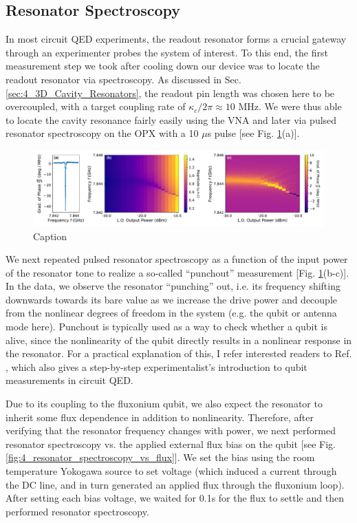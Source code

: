 \subsection{Resonator Spectroscopy}
In most circuit QED experiments, the readout resonator forms a crucial gateway through an experimenter probes the system of interest. To this end, the first measurement step we took after cooling down our device was to locate the readout resonator via spectroscopy. As discussed in Sec. \ref{sec:4_3D_Cavity_Resonators}, the readout pin length was chosen here to be overcoupled, with a target coupling rate of $\kappa_c/2\pi \approx 10$ MHz. We were thus able to locate the cavity resonance fairly easily using the VNA and later via pulsed resonator spectroscopy on the OPX with a 10 $\mu$s pulse [see Fig. \ref{fig:4_resonator_spectroscopy}(a)].
\begin{figure}[h!]
    \centering
    \includegraphics[width=\linewidth]{Figures/4/resonator_spectroscopy.pdf}
    \caption{Caption}
    \label{fig:4_resonator_spectroscopy}
\end{figure}

We next repeated pulsed resonator spectroscopy as a function of the input power of the resonator tone to realize a so-called ``punchout'' measurement [Fig. \ref{fig:4_resonator_spectroscopy}(b-c)]. In the data, we observe the resonator ``punching'' out, i.e. its frequency shifting downwards towards its bare value as we increase the drive power and decouple from the nonlinear degrees of freedom in the system (e.g. the qubit or antenna mode here). Punchout is typically used as a way to check whether a qubit is alive, since the nonlinearity of the qubit directly results in a nonlinear response in the resonator. For a practical explanation of this, I refer interested readers to Ref. \cite{naghiloo2019introduction}, which also gives a step-by-step experimentalist's introduction to qubit measurements in circuit QED. 

Due to its coupling to the fluxonium qubit, we also expect the resonator to inherit some flux dependence in addition to nonlinearity. Therefore, after verifying that the resonator frequency changes with power, we next performed resonator spectroscopy vs. the applied external flux bias on the qubit [see Fig. \ref{fig:4_resonator_spectroscopy_vs_flux}]. We set the bias using the room temperature Yokogawa source to set voltage (which induced a current through the DC line, and in turn generated an applied flux through the fluxonium loop). After setting each bias voltage, we waited for 0.1s for the flux to settle and then performed resonator spectroscopy.  

